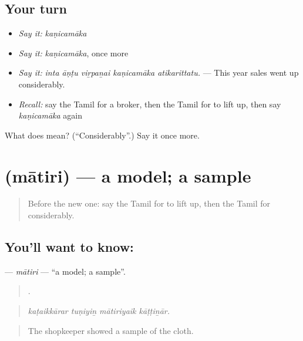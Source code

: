 \subsection*{Your turn}
\begin{itemize}
\raggedright
  \item \emph{Say it:} \emph{kaṇicamāka}
  \item \emph{Say it:} \emph{kaṇicamāka}, once more
  \item \emph{Say it:} \emph{inta āṇṭu viṟpaṉai kaṇicamāka atikarittatu.} — This year sales went up considerably.
  \item \emph{Recall:} say the Tamil for a broker, then the Tamil for to lift up, then say \emph{kaṇicamāka} again
\end{itemize}

\begin{tcolorbox}[breakable,colback=teal!4,colframe=teal!35!black,title={Before you move on}]
What does  mean? (\textquotedblleft{}Considerably\textquotedblright{}.) Say it once more.
\end{tcolorbox}
\section[\texorpdfstring{\ta{மாதிரி} (mātiri)}{மாதிரி (mātiri)}]{ (mātiri) — a model; a sample}

\label{lesson:TA-C545-matiri}



\begin{quote}
Before the new one: say the Tamil for to lift up, then the Tamil for considerably.
\end{quote}

\subsection*{You'll want to know: }
\textbf{} — \emph{mātiri} — \textquotedblleft{}a model; a sample\textquotedblright{}.

\begin{quote}
   .
\end{quote}

\begin{quote}
\emph{kaṭaikkārar tuṇiyiṉ mātiriyaik kāṭṭiṉār.}
\end{quote}

\begin{quote}
The shopkeeper showed a sample of the cloth.
\end{quote}


